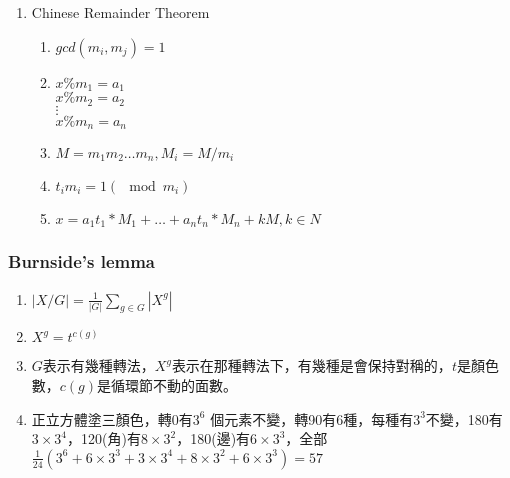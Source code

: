\begin{enumerate}
\item{Chinese Remainder Theorem}
\begin{enumerate}\itemsep = -3pt
\item $gcd(m_i, m_j) = 1$
\item
$x \% m_1 = a_1$\\
$x \% m_2 = a_2$\\
$\vdots$ \\
$x \% m_n = a_n$
\item $M = m_1 m_2 \dots m_n, M_i = M / m_i$
\item $t_i m_i = 1 (\mod m_i)$
\item $x = a_1 t_1 * M_1 + \dots + a_n t_n * M_n + k M, k \in N$
\end{enumerate}

\end{enumerate}


\subsubsection{Burnside's lemma}
\begin{enumerate}\itemsep = -3pt
	\item $|X/G| = \frac{1}{|G|}\sum_{g \in G}|X^g|$
	\item $X^g=t^{c(g)}$
	\item $G$表示有幾種轉法，$X^g$表示在那種轉法下，有幾種是會保持對稱的，$t$是顏色數，$c(g)$是循環節不動的面數。
	\item 正立方體塗三顏色，轉0有$3^6$ 個元素不變，轉90有6種，每種有$3^3$不變，180有$3\times 3^4$，120(角)有$8\times 3^2$，180(邊)有$6\times 3^3$，全部$\frac{1}{24}\left(3^6+6\times 3^3 + 3 \times 3^4 + 8 \times 3^2 + 6 \times 3^3 \right) = 57$
\end{enumerate}

